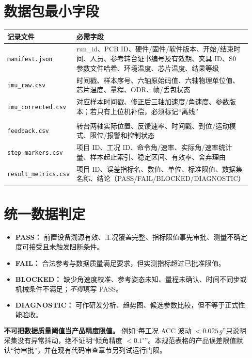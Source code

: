 \section{数据包最小字段}
\begin{longtable}{p{40mm}p{102mm}}
\toprule
记录文件 & 必需字段\\\midrule\endhead
\texttt{manifest.json} & run\_id、PCB ID、硬件/固件/软件版本、开始/结束时间、人员、参考转台证书编号及有效期、夹具 ID、S0 参数文件哈希、环境温度、芯片温度、结果等级\\
\texttt{imu\_raw.csv} & 时间戳、样本序号、六轴原始码值、六轴物理单位值、芯片温度、量程、ODR、帧/丢包状态\\
\texttt{imu\_corrected.csv} & 对应样本时间戳、修正后三轴加速度/角速度、参数版本；若只有上位机补偿，必须标记“离线”\\
\shortstack[l]{\texttt{turntable\_}\\\texttt{feedback.csv}} & 转台两轴实际位置、反馈速率、时间戳、到位/运动模式、限位/报警和控制状态\\
\texttt{step\_markers.csv} & 项目 ID、工况 ID、命令角/速率、实际角/速率统计量、样本起止索引、稳定区间、有效率、舍弃理由\\
\texttt{result\_metrics.csv} & 项目 ID、误差指标名、数值、单位、标准限值、数据集名称、结论（PASS/FAIL/BLOCKED/DIAGNOSTIC）\\\bottomrule
\end{longtable}
\section{统一数据判定}
\begin{itemize}
\item \textbf{PASS：} 前置设备溯源有效、工况覆盖完整、指标限值事先审批、测量不确定度可接受且未触发阻断条件。
\item \textbf{FAIL：} 合法参考与数据质量满足要求，但实测指标超过已批准限值。
\item \textbf{BLOCKED：} 缺少角速度校准、参考姿态未知、量程未确认、时间不同步或机械条件不满足；\emph{不得}填写 PASS。
\item \textbf{DIAGNOSTIC：} 可作研发分析、趋势图、候选参数比较，但不等于正式性能验收。
\end{itemize}
\begin{warningbox}
\textbf{不可把数据质量阈值当产品精度限值。} 例如“每工况 ACC 波动 $<0.025\,g$”只说明采集没有异常抖动，绝不证明“倾角精度 $<0.1^\circ$”。本规范表格的产品误差限值默认“待审批”，并在现有代码审查章节另列试运行门限。
\end{warningbox}
